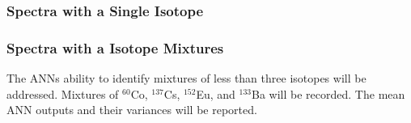 \subsubsection{Spectra with a Single Isotope}




\subsubsection{Spectra with a Isotope Mixtures}


The ANNs ability to identify mixtures of less than three isotopes will be addressed. Mixtures of $^{60}$Co, $^{137}$Cs, $^{152}$Eu, and $^{133}$Ba will be recorded. The mean ANN outputs and their variances will be reported.